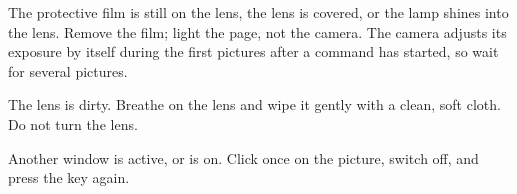 \cause The protective film is still on the lens, the lens is covered, or the lamp shines into
the lens.
\remedy Remove the film; light the page, not the camera. The camera adjusts its exposure by
itself during the first pictures after a command has started, so wait for several pictures.

\cause The lens is dirty.
\remedy Breathe on the lens and wipe it gently with a clean, soft cloth. Do not turn the lens.

\cause Another window is active, or  is on.
\remedy Click once on the picture, switch  off, and press the key again.
